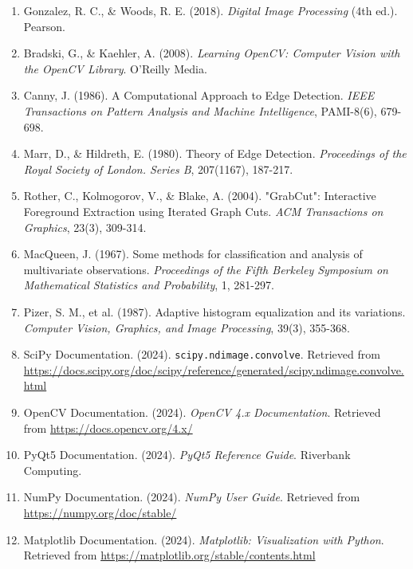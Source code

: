 \documentclass[12pt,a4paper]{article}
\begin{document}
\begin{enumerate}[leftmargin=*]
    \item Gonzalez, R. C., \& Woods, R. E. (2018). \textit{Digital Image Processing} (4th ed.). Pearson.

    \item Bradski, G., \& Kaehler, A. (2008). \textit{Learning OpenCV: Computer Vision with the OpenCV Library}. O'Reilly Media.

    \item Canny, J. (1986). A Computational Approach to Edge Detection. \textit{IEEE Transactions on Pattern Analysis and Machine Intelligence}, PAMI-8(6), 679-698.

    \item Marr, D., \& Hildreth, E. (1980). Theory of Edge Detection. \textit{Proceedings of the Royal Society of London. Series B}, 207(1167), 187-217.

    \item Rother, C., Kolmogorov, V., \& Blake, A. (2004). "GrabCut": Interactive Foreground Extraction using Iterated Graph Cuts. \textit{ACM Transactions on Graphics}, 23(3), 309-314.

    \item MacQueen, J. (1967). Some methods for classification and analysis of multivariate observations. \textit{Proceedings of the Fifth Berkeley Symposium on Mathematical Statistics and Probability}, 1, 281-297.

    \item Pizer, S. M., et al. (1987). Adaptive histogram equalization and its variations. \textit{Computer Vision, Graphics, and Image Processing}, 39(3), 355-368.

    \item SciPy Documentation. (2024). \texttt{scipy.ndimage.convolve}. Retrieved from \url{https://docs.scipy.org/doc/scipy/reference/generated/scipy.ndimage.convolve.html}

    \item OpenCV Documentation. (2024). \textit{OpenCV 4.x Documentation}. Retrieved from \url{https://docs.opencv.org/4.x/}

    \item PyQt5 Documentation. (2024). \textit{PyQt5 Reference Guide}. Riverbank Computing.

    \item NumPy Documentation. (2024). \textit{NumPy User Guide}. Retrieved from \url{https://numpy.org/doc/stable/}

    \item Matplotlib Documentation. (2024). \textit{Matplotlib: Visualization with Python}. Retrieved from \url{https://matplotlib.org/stable/contents.html}


\end{enumerate}
\end{document}
